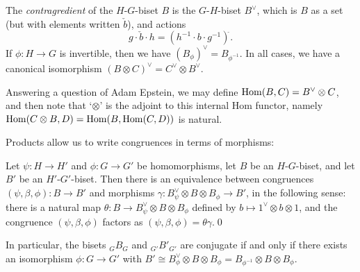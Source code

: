 \documentclass{amsart}
\begin{document}
The \emph{contragredient} of the $H$-$G$-biset $B$ is the $G$-$H$-biset
$B^\vee$, which is $B$ as a set (but with elements written $\check
b$), and actions
\[g\cdot \check b\cdot h=(h^{-1}\cdot b\cdot g^{-1})^{\displaystyle\check{}}.
\]
If $\phi\colon H\to G$ is invertible, then we have
$(B_\phi)^\vee=B_{\phi^{-1}}$.  In all cases, we have a canonical
isomorphism $(B\otimes C)^\vee=C^\vee\otimes B^\vee$.
\begin{rem}
  Answering a question of Adam Epstein, we may define
  $\operatorname{Hom}(B,C)=B^\vee\otimes C$, and then note that `$\otimes$' is the
  adjoint to this internal Hom functor, namely $\operatorname{Hom}(C\otimes
  B,D)=\operatorname{Hom}(B,\operatorname{Hom}(C,D))$ is natural.
\end{rem}

\noindent Products allow us to write congruences in terms of morphisms:
\begin{lem}\label{lem:congruencesmorphisms}
  Let $\psi\colon H\to H'$ and $\phi\colon G\to G'$ be homomorphisms,
  let $B$ be an $H$-$G$-biset, and let $B'$ be an
  $H'$-$G'$-biset. Then there is an equivalence between congruences
  $(\psi,\beta,\phi)\colon B\to B'$ and morphisms $\gamma\colon
  B_\psi^\vee\otimes B\otimes B_\phi\to B'$, in the following sense:
  there is a natural map $\theta\colon B\to B_\psi^\vee\otimes
  B\otimes B_\phi$ defined by $b\mapsto 1^\vee\otimes b\otimes 1$, and
  the congruence $(\psi,\beta,\phi)$ factors as
  $(\psi,\beta,\phi)=\theta\gamma$.\qed
\end{lem}
In particular, the bisets ${}_GB_G$ and ${}_{G'}B'_{G'}$ are conjugate
if and only if there exists an isomorphism $\phi\colon G\to G'$ with
$B'\cong B_\phi^\vee\otimes B\otimes B_\phi=B_{\phi^{-1}}\otimes
B\otimes B_{\phi}$.
\end{document}
